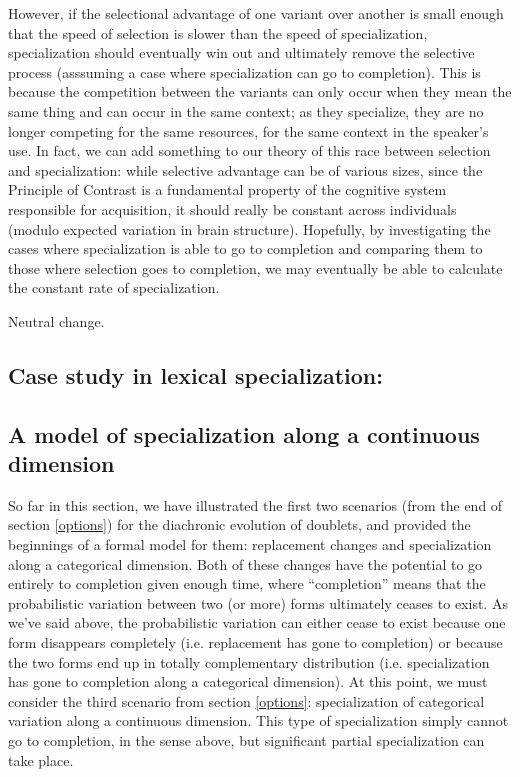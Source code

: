 

However, if the selectional advantage of one variant over another is small enough that the speed of selection is slower than the speed of specialization, specialization should eventually win out and ultimately remove the selective process (asssuming a case where specialization can go to completion).
This is because the competition between the variants can only occur when they mean the same thing and can occur in the same context; as they specialize, they are no longer competing for the same resources, for the same context in the speaker's use.
In fact, we can add something to our theory of this race between selection and specialization: while selective advantage can be of various sizes, since the Principle of Contrast is a fundamental property of the cognitive system responsible for acquisition, it should really be constant across individuals (modulo expected variation in brain structure).
Hopefully, by investigating the cases where specialization is able to go to completion and comparing them to those where selection goes to completion, we may eventually be able to calculate the constant rate of specialization.

Neutral change. \citet{kauhanen2016}

\subsection{Case study in lexical specialization: }

\subsection{A model of specialization along a continuous dimension}

So far in this section, we have illustrated the first two scenarios (from the end of section \ref{options}) for the diachronic evolution of doublets, and provided the beginnings of a formal model for them: replacement changes and specialization along a categorical dimension.
Both of these changes have the potential to go entirely to completion given enough time, where ``completion'' means that the probabilistic variation between two (or more) forms ultimately ceases to exist.
As we've said above, the probabilistic variation can either cease to exist because one form disappears completely (i.e. replacement has gone to completion) or because the two forms end up in totally complementary distribution (i.e. specialization has gone to completion along a categorical dimension).
At this point, we must consider the third scenario from section \ref{options}: specialization of categorical variation along a continuous dimension.
This type of specialization simply cannot go to completion, in the sense above, but significant partial specialization can take place.



